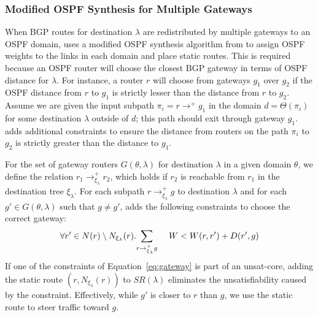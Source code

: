 %
%
%
\subsubsection{Modified OSPF Synthesis for Multiple Gateways}
When BGP routes for destination $\lambda$ 
are redistributed by multiple gateways to an 
OSPF domain, \name uses a modified OSPF synthesis
algorithm from  
to assign OSPF weights to the links in each domain
and place static routes. 
This is 
required because an OSPF router will choose
the closest BGP gateway in terms of OSPF distance 
for $\lambda$. For instance, a router $r$ will choose
from gateways $g_1$ over $g_2$ if the OSPF distance from $r$ to $g_1$ 
is strictly lesser than the distance from $r$ to $g_2$. 
Assume we are given the input subpath $\pi_i=r \rightarrow^+ g_1$ in
the domain $d=\Theta(\pi_i)$ for some destination $\lambda$ outside
of $d$; this path should exit through gateway $g_1$. 
\name adds additional
constraints to ensure the distance  from routers
on the path $\pi_i$ to $g_2$ is strictly
greater than the distance to $g_1$. 

For the set of gateway
routers $G(\theta, \lambda)$ for destination $\lambda$ in a given domain $\theta$, 
we define the relation $r_1 \rightarrow^+_{\xi_{\lambda}} r_2$, which holds if
$r_2$ is reachable from $r_1$ in the destination tree $\xi_\lambda$.
For each subpath $r \rightarrow^+_{\xi_{\lambda}} g$ to destination $\lambda$
and for each $g' \in G(\theta, \lambda)$ such that $g\neq g'$,
\name adds the following constraints to choose the correct gateway:
\begin{equation} \label{eq:gateway}
\forall r' \in N(r) \setminus N_{\xi_\lambda}(r).~
\sum_{\mathclap{r \rightarrow^+_{\xi_{\lambda}} g }}~~~~~W < 
W(r, r') + D(r', g)
\end{equation}
If one of the constraints of Equation~\ref{eq:gateway}
is part of an unsat-core, 
adding the static route $(r, N_{\xi_\lambda}(r))$ 
to $SR(\lambda)$ eliminates the unsatisfiability caused by  
the constraint. Effectively, while $g'$ is closer to
$r$ than $g$, we use the static route to steer traffic toward $g$. 


